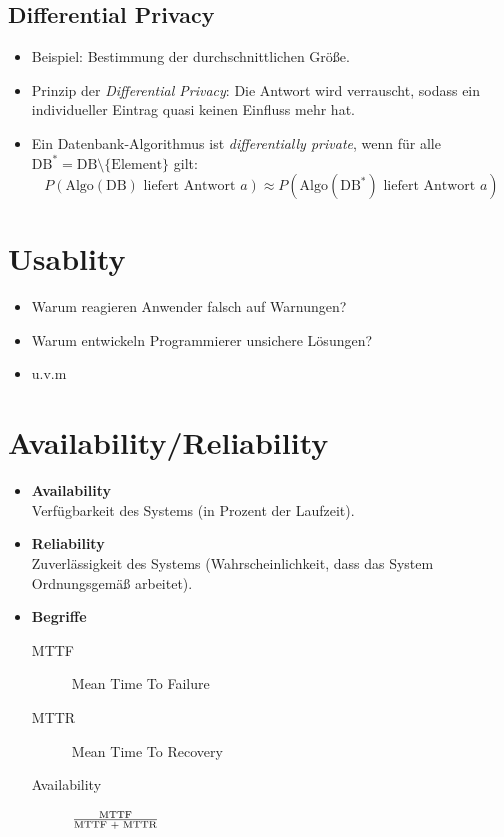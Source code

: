 \documentclass[a4paper, 11pt, accentcolor = tud3b]{tudreport}
\begin{document}
            \subsection{Differential Privacy}
                \begin{itemize}
                	\item Beispiel: Bestimmung der durchschnittlichen Größe.
                	\item Prinzip der \textit{Differential Privacy}: Die Antwort wird verrauscht, sodass ein individueller Eintrag quasi keinen Einfluss mehr hat.
                	\item Ein Datenbank-Algorithmus ist \textit{differentially private}, wenn für alle \( \textrm{DB}^* = \textrm{DB} \setminus \{ \textrm{Element} \} \) gilt:
	                	\begin{equation*}
		                	P(\textrm{Algo}(\textrm{DB}) \textrm{ liefert Antwort } a) \approx P(\textrm{Algo}(\textrm{DB}^*) \textrm{ liefert Antwort } a)
	                	\end{equation*}
                \end{itemize}

        \section{Usablity}
            \begin{itemize}
            	\item Warum reagieren Anwender falsch auf Warnungen?
            	\item Warum entwickeln Programmierer unsichere Lösungen?
            	\item u.v.m
            \end{itemize}

        \section{Availability/Reliability}
            \begin{itemize}
            	\item \textbf{Availability} \\ Verfügbarkeit des Systems (in Prozent der Laufzeit).
            	\item \textbf{Reliability} \\ Zuverlässigkeit des Systems (Wahrscheinlichkeit, dass das System Ordnungsgemäß arbeitet).
            	\item \textbf{Begriffe}
	            	\begin{description}
	            		\item[MTTF] Mean Time To Failure
	            		\item[MTTR] Mean Time To Recovery
	            		\item[Availability] \( \frac{\textrm{MTTF}}{\textrm{MTTF\ + \textrm{MTTR}}} \)
	            	\end{description}
            \end{itemize}
        
\end{document}

